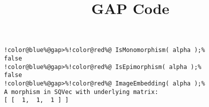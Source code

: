 \documentclass[12pt]{amsart}
\title{GAP Code}
\author{}
\begin{document}
\maketitle

\begin{Verbatim}[commandchars=!@\%,frame=single]
!color@blue%@gap>%!color@red%@ IsMonomorphism( alpha );%
false
!color@blue%@gap>%!color@red%@ IsEpimorphism( alpha );%
false
!color@blue%@gap>%!color@red%@ ImageEmbedding( alpha );%
A morphism in SQVec with underlying matrix:
[ [  1,  1,  1 ] ]

\end{Verbatim}
\end{document}
